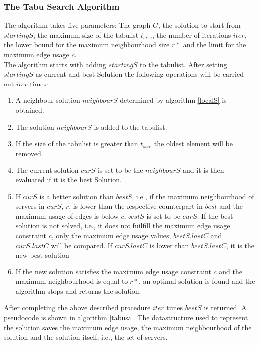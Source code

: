 \documentclass [12pt]{article}
\begin{document}
\subsubsection{The Tabu Search Algorithm}
The algorithm takes five parameters: The graph $G$, the solution
to start from $startingS$, the maximum size of the tabulist $t_{size}$, the number of iterations $iter$, the lower bound for the maximum neighbourhood size
$r*$ and the limit for the maximum edge usage $c$.\\
The algorithm starts with adding $startingS$ to the tabulist.  
After setting $startingS$ as current and best Solution the following operations will be carried out $iter$ times: 
\begin{enumerate}
  \item{A neighbour solution $neighbourS$ determined by algorithm \ref{localS} is obtained.}
  \item{The solution $neighbourS$ is added to the tabulist.}
  \item{If the size of the tabulist is greater than $t_{size}$ the oldest element will be removed.}
  \item{The current solution $curS$ is set to be the $neighbourS$ and it is then evaluated if it is the best Solution.}
  \item{If $curS$ is a better solution than $bestS$, i.e., if the maximum neighbourhood of servers in $curS$, $r$, is lower than the respective counterpart in 
      $best$ and the maximum usage of edges is below $c$, $bestS$ is set to be $curS$. If the best solution is not solved, i.e., it does not fuilfill the
      maximum edge usage constraint $c$, only the maximum edge usage values,
    $bestS.lastC$ and $curS.lastC$ will be compared. If $curS.lastC$ is lower than $bestS.lastC$, it is the new best solution}
  \item{If the new solution satisfies the maximum edge usage constraint $c$ and the maximum neighbourhood is equal to $r*$, an optimal
    solution is found and the algorithm stops and returns the solution.}
\end{enumerate}

After completing the above described procedure $iter$ times $bestS$ is returned.
A pseudocode is shown in algorithm \ref{tabusa}. The datastructure used to represent the solution saves the maximum edge usage, the maximum neighbourhood
of the solution and the solution itself, i.e., the set of servers. 
\end{document}

